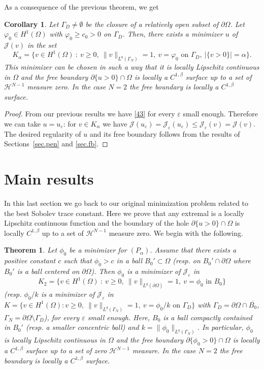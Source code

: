 \documentclass[11pt]{amsart}
\newtheorem{theorem}{Theorem}[section]
\newtheorem{corollary}{Corollary}[section]
\theoremstyle{definition}
\theoremstyle{remark}
\numberwithin{equation}{section}
\newcommand{\cH}{\mathcal{H}}
\newcommand{\cJ}{\mathcal{J}}
\begin{document}
As a consequence of the previous theorem, we get

\begin{corollary}\label{c.Kalpha}
Let $\Gamma_D\neq\emptyset$ be the closure of a relatively open subset of $\partial\Omega$. Let $\varphi_0\in H^1(\Omega)$ with $\varphi_0\ge c_0>0$ on $\Gamma_D$. Then, there exists a minimizer $u$ of $\cJ(v)$ in the set
\[
K_\alpha=\{v\in H^1(\Omega)\ :\ v\ge0,\ \|v\|_{L^q(\Gamma_N)}=1,\ v=\varphi_0\text{ on }\Gamma_D,\ |\{v>0\}|=\alpha\}.
\]
This minimizer can be chosen in such a way that it is locally Lipschitz continuous in $\Omega$ and the free boundary $\partial\{u>0\}\cap\Omega$ is locally a $C^{1,\beta}$ surface up to a set of $\cH^{N-1}$ measure zero. In the case $N=2$ the free boundary is locally a $C^{1,\beta}$ surface.
\end{corollary}

\begin{proof}
From our previous results we have \eqref{43} for every $\varepsilon$ small enough. Therefore we can take $u=u_\varepsilon$: for $v\in K_\alpha$ we have $\cJ(u_\varepsilon)=\cJ_\varepsilon(u_\varepsilon)\le\cJ_\varepsilon(v)=\cJ(v)$. The desired regularity of $u$ and its free boundary follows from the results of Sections~\ref{sec.pen} and \ref{sec.fb}.
\end{proof}

\section{Main results}\label{sec.main}

In this last section we go back to our original minimization problem related to the best Sobolev trace constant. Here we prove that any extremal is a locally Lipschitz continuous function and the boundary of the hole $\partial\{u>0\}\cap\Omega$ is locally $C^{1,\beta}$ up to a set of $\cH^{N-1}$ measure zero. We begin with the following.

\begin{theorem}\label{t.orig}
Let $\phi_0$ be a minimizer for $(P_\alpha)$. Assume that there exists a positive constant $c$ such that $\phi_0>c$ in a ball $B_0'\subset\Omega$ (resp. on $B_0'\cap\partial\Omega$ where $B_0'$ is a ball centered on $\partial\Omega$). Then $\phi_0$ is a minimizer of $\cJ_\varepsilon$ in
\[
K_2=\{v\in H^1(\Omega)\ :\ v\ge0,\ \|v\|_{L^q(\partial\Omega)}=1,\ v=\phi_0\text{ in }B_0\}
\]
(resp. $\phi_0/k$ is a minimizer of $\cJ_\varepsilon$ in $K=\{v\in H^1(\Omega):v\ge0,\ \|v\|_{L^q(\Gamma_N)}=1,\ v=\phi_0/k\text{ on }\Gamma_D\}$ with $\Gamma_D=\partial\Omega\cap\overline{B_0}$, $\Gamma_N=\partial\Omega\setminus\Gamma_D$), for every $\varepsilon$ small enough. Here, $B_0$ is a ball compactly contained in $B_0'$ (resp. a smaller concentric ball) and $k=\|\phi_0\|_{L^q(\Gamma_N)}$. In particular, $\phi_0$ is locally Lipschitz continuous in $\Omega$ and the free boundary $\partial\{\phi_0>0\}\cap\Omega$ is locally a $C^{1,\beta}$ surface up to a set of zero $\cH^{N-1}$ measure. In the case $N=2$ the free boundary is locally a $C^{1,\beta}$ surface.
\end{theorem}
\end{document}
